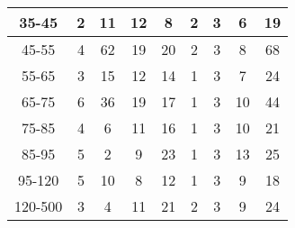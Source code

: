 \begin{table}[h]
\begin{center}
\begin{tabular}{|c|c|c|c|c|c|c|c|c|}
    35-45 & 2 & 11 & 12 & 8 & 2 & 3 & 6 & 19 \\ \hline
    45-55 & 4 & 62 & 19 & 20 & 2 & 3 & 8 & 68 \\ \hline
    55-65 & 3 & 15 & 12 & 14 & 1 & 3 & 7 & 24 \\ \hline
    65-75 & 6 & 36 & 19 & 17 & 1 & 3 & 10 & 44 \\ \hline
    75-85 & 4 & 6 & 11 & 16 & 1 & 3 & 10 & 21 \\ \hline
    85-95 & 5 & 2 & 9 & 23 & 1 & 3 & 13 & 25 \\ \hline
    95-120 & 5 & 10 & 8 & 12 & 1 & 3 & 9 & 18 \\ \hline
    120-500 & 3 & 4 & 11 & 21 & 2 & 3 & 9 & 24 \\ \hline
  \end{tabular}
  \label{tab:systInPercent_MUON_WGamma}
  \end{center}
\end{table}

